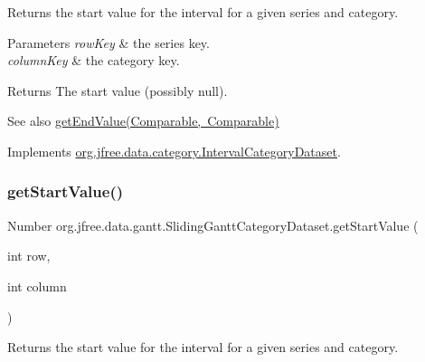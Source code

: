 Returns the start value for the interval for a given series and category.


\begin{DoxyParams}{Parameters}
{\em row\+Key} & the series key. \\
\hline
{\em column\+Key} & the category key.\\
\hline
\end{DoxyParams}
\begin{DoxyReturn}{Returns}
The start value (possibly {\ttfamily null}).
\end{DoxyReturn}
\begin{DoxySeeAlso}{See also}
\mbox{\hyperlink{classorg_1_1jfree_1_1data_1_1gantt_1_1_sliding_gantt_category_dataset_ad3151981161728bc2ac87c499a8c1ea6}{get\+End\+Value(\+Comparable, Comparable)}} 
\end{DoxySeeAlso}


Implements \mbox{\hyperlink{interfaceorg_1_1jfree_1_1data_1_1category_1_1_interval_category_dataset_aec932dc7f50bf72be26002494a266e2e}{org.\+jfree.\+data.\+category.\+Interval\+Category\+Dataset}}.

\mbox{\label{classorg_1_1jfree_1_1data_1_1gantt_1_1_sliding_gantt_category_dataset_af0c6faccd8c5771ee5d994691b836296}} 
\subsubsection{\texorpdfstring{get\+Start\+Value()}{getStartValue()}\hspace{0.1cm}{\footnotesize\ttfamily [4/4]}}
{\footnotesize\ttfamily Number org.\+jfree.\+data.\+gantt.\+Sliding\+Gantt\+Category\+Dataset.\+get\+Start\+Value (\begin{DoxyParamCaption}\item[{int}]{row,  }\item[{int}]{column }\end{DoxyParamCaption})}

Returns the start value for the interval for a given series and category.


